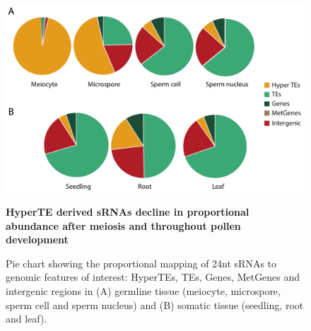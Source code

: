 \begin{figure}[htbp!] 
\centering    
    \includegraphics[width=1\textwidth]{Chapter2/Figs/Figure7_Pie_charts.pdf}
\caption{\textbf{HyperTE derived sRNAs decline in proportional abundance after meiosis and throughout pollen development}}
\label{fig:sRNA_pie}
\captionsetup{font=small}
    \caption*{Pie chart showing the proportional mapping of 24nt sRNAs to genomic features of interest: HyperTEs, TEs, Genes, MetGenes and intergenic regions in (A) germline tissue (meiocyte, microspore, sperm cell and sperm nucleus) and (B) somatic tissue (seedling, root and leaf).}
\end{figure}

